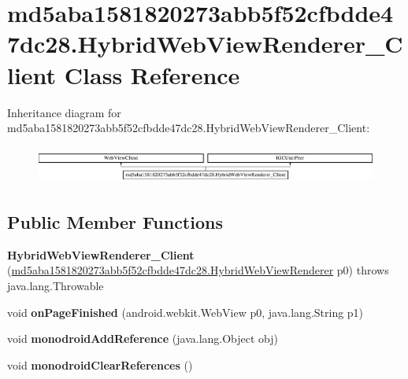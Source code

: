 \hypertarget{classmd5aba1581820273abb5f52cfbdde47dc28_1_1HybridWebViewRenderer__Client}{}\section{md5aba1581820273abb5f52cfbdde47dc28.\+Hybrid\+Web\+View\+Renderer\+\_\+\+Client Class Reference}
\label{classmd5aba1581820273abb5f52cfbdde47dc28_1_1HybridWebViewRenderer__Client}
Inheritance diagram for md5aba1581820273abb5f52cfbdde47dc28.\+Hybrid\+Web\+View\+Renderer\+\_\+\+Client\+:\begin{figure}[H]
\begin{center}
\leavevmode
\includegraphics[height=1.250000cm]{classmd5aba1581820273abb5f52cfbdde47dc28_1_1HybridWebViewRenderer__Client}
\end{center}
\end{figure}
\subsection*{Public Member Functions}
\begin{DoxyCompactItemize}
\item 
\hypertarget{classmd5aba1581820273abb5f52cfbdde47dc28_1_1HybridWebViewRenderer__Client_a60a73a00776b8b65804c67407871c76c}{}{\bfseries Hybrid\+Web\+View\+Renderer\+\_\+\+Client} (\hyperlink{classmd5aba1581820273abb5f52cfbdde47dc28_1_1HybridWebViewRenderer}{md5aba1581820273abb5f52cfbdde47dc28.\+Hybrid\+Web\+View\+Renderer} p0)  throws java.\+lang.\+Throwable 	\label{classmd5aba1581820273abb5f52cfbdde47dc28_1_1HybridWebViewRenderer__Client_a60a73a00776b8b65804c67407871c76c}

\item 
\hypertarget{classmd5aba1581820273abb5f52cfbdde47dc28_1_1HybridWebViewRenderer__Client_a17f8c2de89ac7892e30ee8743d526acc}{}void {\bfseries on\+Page\+Finished} (android.\+webkit.\+Web\+View p0, java.\+lang.\+String p1)\label{classmd5aba1581820273abb5f52cfbdde47dc28_1_1HybridWebViewRenderer__Client_a17f8c2de89ac7892e30ee8743d526acc}

\item 
\hypertarget{classmd5aba1581820273abb5f52cfbdde47dc28_1_1HybridWebViewRenderer__Client_a9adf370a335b2c02789a0cca9e36d627}{}void {\bfseries monodroid\+Add\+Reference} (java.\+lang.\+Object obj)\label{classmd5aba1581820273abb5f52cfbdde47dc28_1_1HybridWebViewRenderer__Client_a9adf370a335b2c02789a0cca9e36d627}

\item 
\hypertarget{classmd5aba1581820273abb5f52cfbdde47dc28_1_1HybridWebViewRenderer__Client_a00f932d065ff107d38d605d6ad430e49}{}void {\bfseries monodroid\+Clear\+References} ()\label{classmd5aba1581820273abb5f52cfbdde47dc28_1_1HybridWebViewRenderer__Client_a00f932d065ff107d38d605d6ad430e49}

\end{DoxyCompactItemize}


